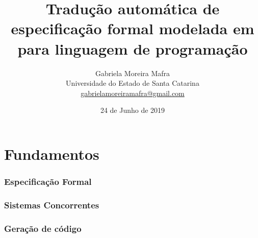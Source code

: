 \documentclass{beamer}
\title[De \TLA para linguagem de programação]{Tradução automática de especificação formal modelada em \TLA para linguagem de programação}
\author[Gabriela M. Mafra]{
    Gabriela Moreira Mafra\\\smallskip
    {\scriptsize Universidade do Estado de Santa Catarina \\\smallskip
    \vspace{-2mm}
    \url{gabrielamoreiramafra@gmail.com}}
}
\begin{document}
  \date{24 de Junho de 2019}
  \begin{frame}
      \titlepage
  \end{frame}

\tableofcontents

\section{Fundamentos}

\begin{frame}
  \frametitle{Especificação Formal}



\end{frame}

\begin{frame}
  \frametitle{Sistemas Concorrentes}



\end{frame}

\begin{frame}
  \frametitle{Geração de código}



\end{frame}
\end{document}
